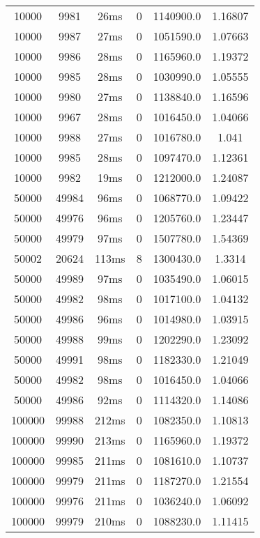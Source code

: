 \documentclass[./main.tex]{subfiles}
\begin{document}
\begin{table}
\begin{tabular}{ c | c | c | c | c | c }
        10000 & 9981 & 26ms & 0 & 1140900.0 & 1.16807 \\
        10000 & 9987 & 27ms & 0 & 1051590.0 & 1.07663 \\
        10000 & 9986 & 28ms & 0 & 1165960.0 & 1.19372 \\
        10000 & 9985 & 28ms & 0 & 1030990.0 & 1.05555 \\
        10000 & 9980 & 27ms & 0 & 1138840.0 & 1.16596 \\
        10000 & 9967 & 28ms & 0 & 1016450.0 & 1.04066 \\
        10000 & 9988 & 27ms & 0 & 1016780.0 & 1.041 \\
        10000 & 9985 & 28ms & 0 & 1097470.0 & 1.12361 \\
        10000 & 9982 & 19ms & 0 & 1212000.0 & 1.24087 \\
        \hline
        50000 & 49984 & 96ms & 0 & 1068770.0 & 1.09422 \\
        50000 & 49976 & 96ms & 0 & 1205760.0 & 1.23447 \\
        50000 & 49979 & 97ms & 0 & 1507780.0 & 1.54369 \\
        50002 & 20624 & 113ms & 8 & 1300430.0 & 1.3314 \\
        50000 & 49989 & 97ms & 0 & 1035490.0 & 1.06015 \\
        50000 & 49982 & 98ms & 0 & 1017100.0 & 1.04132 \\
        50000 & 49986 & 96ms & 0 & 1014980.0 & 1.03915 \\
        50000 & 49988 & 99ms & 0 & 1202290.0 & 1.23092 \\
        50000 & 49991 & 98ms & 0 & 1182330.0 & 1.21049 \\
        50000 & 49982 & 98ms & 0 & 1016450.0 & 1.04066 \\
        \rowcolor{lightgray} 50000 & 49986 & 92ms & 0 & 1114320.0 & 1.14086 \\
        \hline
        \rowcolor{lightgray} 100000 & 99988 & 212ms & 0 & 1082350.0 & 1.10813 \\
        100000 & 99990 & 213ms & 0 & 1165960.0 & 1.19372 \\
        100000 & 99985 & 211ms & 0 & 1081610.0 & 1.10737 \\
        100000 & 99979 & 211ms & 0 & 1187270.0 & 1.21554 \\
        100000 & 99976 & 211ms & 0 & 1036240.0 & 1.06092 \\
        100000 & 99979 & 210ms & 0 & 1088230.0 & 1.11415 \\

\end{tabular}
\end{table}
\end{document}
